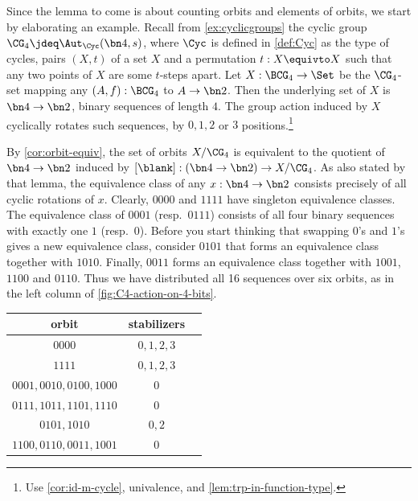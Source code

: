 \begin{example}\label{exa:prep-burnside}
Since the lemma to come is about counting orbits and
elements of orbits, we start by elaborating an example.
Recall from \cref{ex:cyclicgroups} the cyclic group 
$\CG_4 \jdeq\Aut_{\Cyc}(\bn4,s)$, where $\Cyc$ is defined
in \cref{def:Cyc} as the type of cycles, \ie pairs $(X,t)$ of 
a set $X$ and a permutation $t:X\equivto X$ such that any two
points of $X$ are some $t$-steps apart.
Let $X: \BCG_4\to\Set$ be the $\CG_4$-set mapping any $(A,f):\BCG_4$
to $A\to\bn2$. Then the underlying set of $X$ is $\bn4\to\bn2$,
\ie binary sequences of length $4$. The group action induced by $X$
cyclically rotates such sequences, by $0,1,2$ or $3$ positions.\footnote{%
Use \cref{cor:id-m-cycle}, univalence, and \cref{lem:trp-in-function-type}.}

By \cref{cor:orbit-equiv}, the set of orbits $X/\CG_4$ is
equivalent to the quotient of $\bn4\to\bn2$ induced by 
$[\blank] : (\bn4\to\bn2) \to X/\CG_4$. %
As also stated by that lemma, the equivalence class of any $x:\bn4\to\bn2$
consists precisely of all cyclic rotations of $x$. Clearly, 
$0000$ and $1111$ have singleton equivalence classes.
The equivalence class of $0001$ (resp.\ $0111$) consists of all four binary 
sequences with exactly one $1$ (resp.\ $0$).  Before you start thinking that
swapping $0$'s and $1$'s gives a new equivalence class, consider 
$0101$ that forms an equivalence class together with $1010$.
Finally, $0011$ forms an equivalence class together with $1001$,
$1100$ and $0110$. Thus we have distributed all 16 sequences over
six orbits, as in the left column of \cref{fig:C4-action-on-4-bits}.

\begin{margintable}
  \footnotesize
\begin{tabular}{ccc} \toprule
 orbit & stabilizers \\ \midrule
 $0000$ & $0,1,2,3$ \\
 $1111$ & $0,1,2,3$ \\
 $0001,0010,0100,1000$ & $0$ \\
 $0111,1011,1101,1110$ & $0$ \\
 $0101,1010$ & $0,2$ \\
 $1100,0110,0011,1001$ & $0$ \\ \bottomrule
\end{tabular}
\caption{\label{fig:C4-action-on-4-bits}
Underlying sets of orbits and the stabilizers of their elements.}
\end{margintable}


\end{example}
